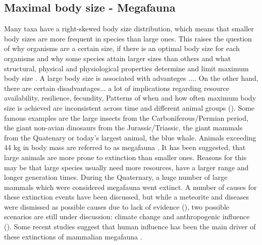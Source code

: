 \subsection{Maximal body size - Megafauna}
Many taxa have a right-skewed body size distribution, which means that smaller body sizes are more frequent in species than large ones. This raises the question of why organisms are a certain size, if there is an optimal body size for each organisms and why some species attain larger sizes than others and what 
structural, physical and physiological properties determine and limit maximum body size
\citep{Smith2009}.
A large body size is associated with advanteges ....
On the other hand, there are certain disadvantages...
a lot of implications regarding resource availability, resilience, fecundity, 
Patterns of when and how often maximum body size is achieved are inconsistent across time and different animal groups ().
Some famous examples are the large insects from the Carboniferous/Permian period, the giant non-avian dinosaurs from the Jurassic/Triassic, the giant mammals from the Quatenary or today's largest animal, the blue whale.
Animals exceeding 44 kg in body mass are referred to as megafauna \citep{Barnosky2004, Sandom2014}.
It has been suggested, that large animals are more prone to extinction than smaller ones. Reasons for this may be that large species usually need more resources, have a larger range and longer generation times. During the Quaternary, a huge number of large mammals which were considered megafauna went extinct.
A number of causes for these extinction events have been discussed, but while a meteorite and diseases were dismissed as possible causes due to lack of evidence (), two possible scenarios are still under discussion: climate change and anthropogenic influence ().
Some recent studies suggest that human influence has been the main driver of these extinctions of mammalian megafauna \citep{Barnosky2004,Sandom2014,Gibbons2004,Schuster2000}.

